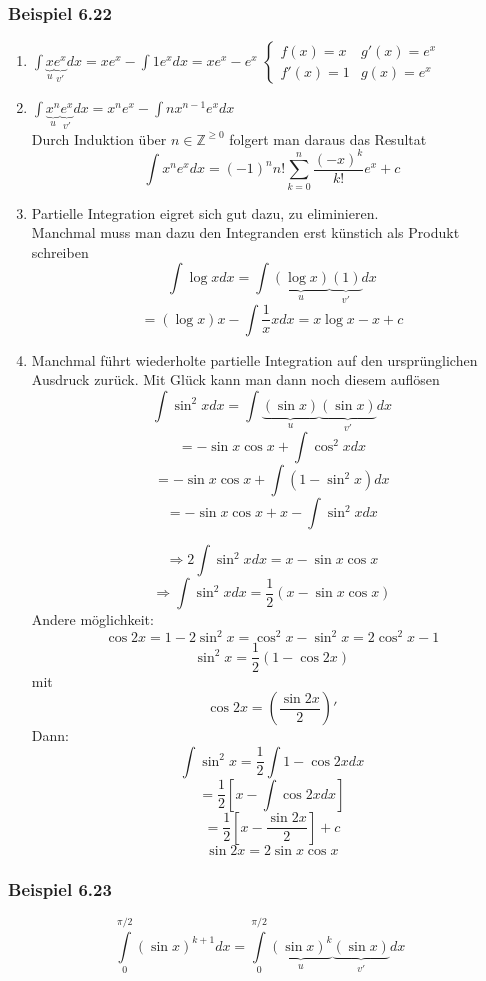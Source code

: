 \subsubsection*{Beispiel 6.22}
\begin{enumerate}
\item $\int {\underbrace x_u\underbrace {{e^x}}_{v'}dx = x{e^x} - \int {1{e^x}dx} } =x e^x - e^x$
$\left\{\begin{array}{cc} f(x)=x & g'(x)=e^x \\ f'(x)=1 & g(x)=e^x\end{array}\right.$

\item $\int {\underbrace {{x^n}}_u\underbrace {{e^x}}_{v'}dx = {x^n}{e^x} - \int {n{x^{n - 1}}{e^x}dx} } $\\
Durch Induktion über $n\in\mathbb{Z}^{\geq 0}$ folgert man daraus das Resultat \[\int {{x^n}{e^x}dx = {{( - 1)}^n}n!\sum\limits_{k = 0}^n {\frac{{{{( - x)}^k}}}{{k!}}{e^x} + c} } \]

\item Partielle Integration eigret sich gut dazu,  zu eliminieren.\\
Manchmal muss man dazu den Integranden erst künstich als Produkt schreiben
\[\int {\log xdx = \int {\underbrace {(\log x)}_u\underbrace {(1)}_{v'}dx} } \]
\[ = (\log x)x - \int {\frac{1}{x}} xdx = x\log x - x + c\]

\item Manchmal führt wiederholte partielle Integration auf den ursprünglichen Ausdruck zurück. Mit Glück kann man dann noch diesem auflösen 
\[\int {{{\sin }^2}xdx = \int {\underbrace {(\sin x)}_u\underbrace {(\sin x)}_{v'}dx} } \]
$$ =  - \sin x\cos x + \int {{{\cos }^2}xdx}$$
$$ =  - \sin x\cos x + \int {(1 - {{\sin }^2}x)dx}$$
$$ =  - \sin x\cos x + x - \int {{{\sin }^2}xdx} $$

\[ \Rightarrow 2\int {{{\sin }^2}xdx = x - \sin x\cos x} \]
\[ \Rightarrow \int {{{\sin }^2}xdx = \frac{1}{2}\left( {x - \sin x\cos x}  \right)} \]
Andere möglichkeit:
$$\cos 2x = 1-2\sin^2x=\cos^2x-\sin^2x=2\cos^2x-1$$
$$\sin^2x=\frac{1}{2}(1-\cos 2x)$$
mit $$\cos 2x=\left(\frac{\sin 2x}{2} \right)'$$
Dann: $$\int{\sin^2 x}=\frac{1}{2}\int{1-\cos 2x dx}$$
$$=\frac{1}{2}\left[ x-\int{\cos 2x dx}\right]$$
$$=\frac{1}{2}\left[ x-\frac{\sin 2x}{2}\right] +c$$
$$\sin 2x =2\sin x\cos x$$
\end{enumerate}

\subsubsection*{Beispiel 6.23}
\[\int\limits_0^{\pi /2} {{{(\sin x)}^{k + 1}}dx = \int\limits_0^{\pi /2} {\underbrace {{{(\sin x)}^k}}_u\underbrace {(\sin x)}_{v'}dx} } \]


